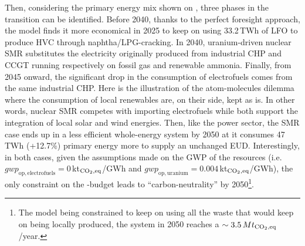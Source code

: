 \documentclass[11pt,twoside,a4paper,english]{article}
\def\ie{i.e.\ }
\begin{document}
Then, considering the primary energy mix shown on , three phases in the transition can be identified. Before 2040, thanks to the perfect foresight approach, the model finds it more economical in 2025 to keep on using 33.2\,TWh of \gls{LFO} to produce \gls{HVC} through naphtha/LPG-cracking. In 2040, uranium-driven nuclear SMR substitutes the electricity originally produced from industrial \gls{CHP} and \gls{CCGT} running respectively on fossil gas and renewable ammonia. Finally, from 2045 onward, the significant drop in the consumption of electrofuels comes from the same industrial \gls{CHP}. Here is the illustration of the atom-molecules dilemma where the consumption of local renewables are, on their side, kept as is. In other words, nuclear SMR competes with importing electrofuels while both support the integration of local solar and wind energies. Then, like the power sector, the SMR case ends up in a less efficient whole-energy system by 2050 at it consumes 47\,TWh (+12.7\%) primary energy more to supply an unchanged \gls{EUD}. Interestingly, in both cases, given the assumptions made on the \gls{GWP} of the resources (\ie $\mathit{gwp}_{\mathrm{op,electrofuels}}=0$\,kt$_{\ce{CO2},\text{eq}}$/GWh and $\mathit{gwp}_{\mathrm{op,uranium}}=0.004$\,kt$_{\ce{CO2},\text{eq}}$/GWh), the only constraint on the -budget leads to ``carbon-neutrality'' by 2050\footnote{The model being constrained to keep on using all the waste that would keep on being locally produced, the system in 2050 reaches a $\sim 3.5\,Mt_{\ce{CO2},\text{eq}}$/year.}.
\end{document}
